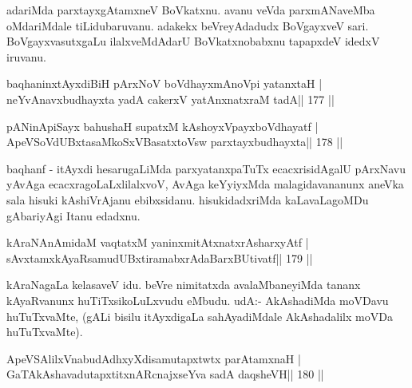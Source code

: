 \begin{artha}
adariMda parxtayxgAtamxneV BoVkatxnu. avanu veVda parxmANaveMba  oMdariMdale tiLidubaruvanu. adakekx beVreyAdadudx BoVgayxveV sari. BoVgayxvasutxgaLu ilalxveMdAdarU BoVkatxnobabxnu tapapxdeV idedxV iruvanu.
\end{artha}

\begin{shl}
baqhaninxtAyxdiBiH pArxNoV boVdhayxmAnoV\s pi yatanxtaH |
neYvAnavxbudhayxta yadA cakerxV yatAnxnatxraM tadA\hfill || 177 ||
\end{shl}

\begin{shl}
pANinA\s\s piSayx bahushaH supatxM kAshoyxV\s payxboVdhayatf |
ApeVSoVdUBxtasaMkoSxVBasatxtoV\s sw parxtayxbudhayxta\hfill || 178 ||
\end{shl}

\begin{artha}
baqhanf - itAyxdi hesarugaLiMda parxyatanxpaTuTx ecacxrisidAgalU  pArxNavu yAvAga ecacxragoLaLxlilalxvoV, AvAga keYyiyxMda  malagidavananunx aneVka sala hisuki kAshiVrAjanu ebibxsidanu.  hisukidadxriMda kaLavaLagoMDu gAbariyAgi Itanu edadxnu.
\end{artha}


\begin{shl}
kAraNAnAmidaM vaqtatxM yaninxmitAtxnatxrAsharxyAtf |
sAvxtamxkAyaRsamudUBxtiramabxrAdaBarxBUtivatf\hfill || 179 ||
\end{shl}

\begin{artha}
kAraNagaLa kelasaveV idu. beVre nimitatxda avalaMbaneyiMda tananx  kAyaRvanunx huTiTxsikoLuLxvudu eMbudu. udA:- AkAshadiMda moVDavu  huTuTxvaMte, (gALi bisilu itAyxdigaLa sahAyadiMdale AkAshadalilx moVDa huTuTxvaMte).
\end{artha}


\begin{shl}
ApeVSAlilxVnabudAdhxyXdisamutapxtwtx parAtamxnaH |
GaTAkAshavadutapxtitxnARcnajxseYva sadA daqsheVH\hfill || 180 ||
\end{shl}

